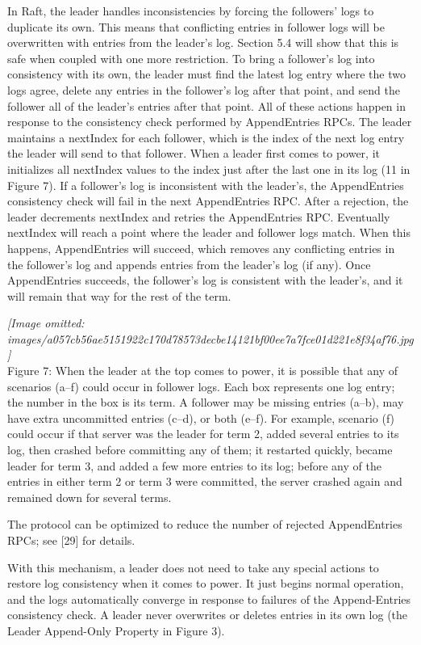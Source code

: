 \documentclass[
]{article}
\begin{document}
In Raft, the leader handles inconsistencies by forcing the followers'
logs to duplicate its own. This means that conflicting entries in
follower logs will be overwritten with entries from the leader's log.
Section 5.4 will show that this is safe when coupled with one more
restriction. To bring a follower's log into consistency with its own,
the leader must find the latest log entry where the two logs agree,
delete any entries in the follower's log after that point, and send the
follower all of the leader's entries after that point. All of these
actions happen in response to the consistency check performed by
AppendEntries RPCs. The leader maintains a nextIndex for each follower,
which is the index of the next log entry the leader will send to that
follower. When a leader first comes to power, it initializes all
nextIndex values to the index just after the last one in its log (11 in
Figure 7). If a follower's log is inconsistent with the leader's, the
AppendEntries consistency check will fail in the next AppendEntries RPC.
After a rejection, the leader decrements nextIndex and retries the
AppendEntries RPC. Eventually nextIndex will reach a point where the
leader and follower logs match. When this happens, AppendEntries will
succeed, which removes any conflicting entries in the follower's log and
appends entries from the leader's log (if any). Once AppendEntries
succeeds, the follower's log is consistent with the leader's, and it
will remain that way for the rest of the term.

\textit{[Image omitted: images/a057cb56ae5151922c170d78573decbe14121bf00ee7a7fce01d221e8f34af76.jpg]}\\
Figure 7: When the leader at the top comes to power, it is possible that
any of scenarios (a--f) could occur in follower logs. Each box
represents one log entry; the number in the box is its term. A follower
may be missing entries (a--b), may have extra uncommitted entries
(c--d), or both (e--f). For example, scenario (f) could occur if that
server was the leader for term 2, added several entries to its log, then
crashed before committing any of them; it restarted quickly, became
leader for term 3, and added a few more entries to its log; before any
of the entries in either term 2 or term 3 were committed, the server
crashed again and remained down for several terms.

The protocol can be optimized to reduce the number of rejected
AppendEntries RPCs; see {[}29{]} for details.

With this mechanism, a leader does not need to take any special actions
to restore log consistency when it comes to power. It just begins normal
operation, and the logs automatically converge in response to failures
of the Append-Entries consistency check. A leader never overwrites or
deletes entries in its own log (the Leader Append-Only Property in
Figure 3).
\end{document}
